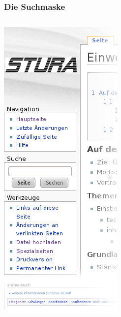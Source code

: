 \documentclass{beamer}
\begin{document}
\begin{frame}
  \frametitle{Die Suchmaske}

  \centering

  \begin{columns}
    \begin{column}{0.3\linewidth}
      \begin{center}
        \includegraphics[width=\linewidth]{Stura-Wiki-Seitenleiste}
      \end{center}
    \end{column}


\end{columns}
\end{frame}
\end{document}
